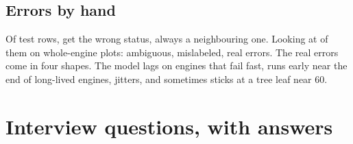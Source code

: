 \documentclass[11pt,a4paper]{article}
\begin{document}
\subsection{Errors by hand}
Of \EaTestRows{} test rows, \EaMisclassifiedRows{} get the wrong status, always a neighbouring one. Looking at
\EaInspected{} of them on whole-engine plots: \EaAmbiguous{} ambiguous, \EaMislabeled{} mislabeled, \EaModel{}
real errors. The real errors come in four shapes. The model lags on engines that fail fast, runs early near the
end of long-lived engines, jitters, and sometimes sticks at a tree leaf near 60.

\section{Interview questions, with answers}
\end{document}
